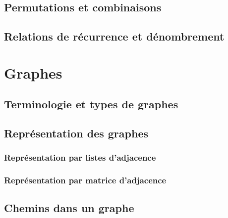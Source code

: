 \documentclass[
  letterpaper,
]{scrbook}
\theoremstyle{definition}
\theoremstyle{definition}
\theoremstyle{plain}
\theoremstyle{remark}
\begin{document}
\hypertarget{permutations-et-combinaisons}{%
\section{Permutations et
combinaisons}\label{permutations-et-combinaisons}}

\hypertarget{relations-de-ruxe9currence-et-duxe9nombrement}{%
\section{Relations de récurrence et
dénombrement}\label{relations-de-ruxe9currence-et-duxe9nombrement}}


\hypertarget{graphes}{%
\chapter{Graphes}\label{graphes}}

\hypertarget{terminologie-et-types-de-graphes}{%
\section{Terminologie et types de
graphes}\label{terminologie-et-types-de-graphes}}

\hypertarget{repruxe9sentation-des-graphes}{%
\section{Représentation des
graphes}\label{repruxe9sentation-des-graphes}}

\hypertarget{repruxe9sentation-par-listes-dadjacence}{%
\subsection{Représentation par listes
d'adjacence}\label{repruxe9sentation-par-listes-dadjacence}}

\hypertarget{repruxe9sentation-par-matrice-dadjacence}{%
\subsection{Représentation par matrice
d'adjacence}\label{repruxe9sentation-par-matrice-dadjacence}}

\hypertarget{chemins-dans-un-graphe}{%
\section{Chemins dans un graphe}\label{chemins-dans-un-graphe}}
\end{document}
